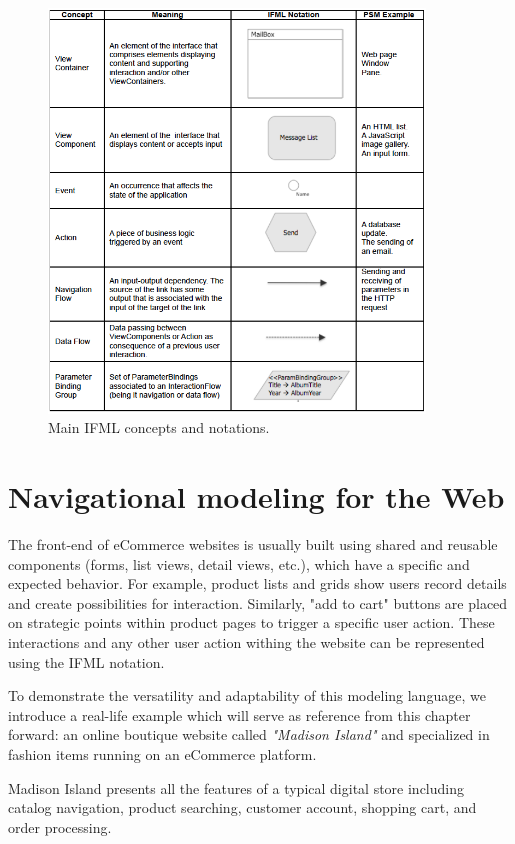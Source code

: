 \vspace{0.5cm}
\begin{figure}[H]
  \centering
    \includegraphics[width=10cm]{images/ifml.jpg}
  \caption{Main IFML concepts and notations.}
  \label{fig:ifml}
\end{figure}
\vspace{0.5cm}

\newpage

\section{Navigational modeling for the Web}
\label{navigational-modeling-for-the-web}
The front-end of eCommerce websites is usually built using shared and reusable components (forms, list views, detail views, etc.), which have a specific and expected behavior.
For example, product lists and grids show users record details and create possibilities for interaction. Similarly, "add to cart" buttons are placed on strategic points within product pages to trigger a specific user action.
These interactions and any other user action withing the website can be represented using the IFML notation.

To demonstrate the versatility and adaptability of this modeling language, we introduce a real-life example which will serve as reference from this chapter forward: an online boutique website called \textit{"Madison Island"} and specialized in fashion items running on an eCommerce platform.

Madison Island presents all the features of a typical digital store including catalog navigation, product searching, customer account, shopping cart, and order processing. 


